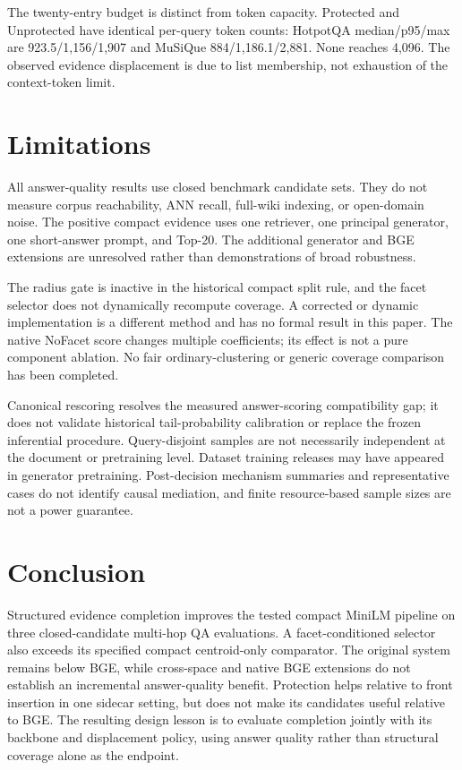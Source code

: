 \documentclass[11pt]{article}
\begin{document}
The twenty-entry budget is distinct from token capacity. Protected and
Unprotected have identical per-query token counts: HotpotQA median/p95/max
are 923.5/1,156/1,907 and MuSiQue 884/1,186.1/2,881. None reaches 4,096.
The observed evidence displacement is due to list membership, not exhaustion
of the context-token limit.

\section{Limitations}
All answer-quality results use closed benchmark candidate sets. They do not
measure corpus reachability, ANN recall, full-wiki indexing, or open-domain
noise. The positive compact evidence uses one retriever, one principal
generator, one short-answer prompt, and Top-20. The additional generator and
BGE extensions are unresolved rather than demonstrations of broad robustness.

The radius gate is inactive in the historical compact split rule, and the
facet selector does not dynamically recompute coverage. A corrected or
dynamic implementation is a different method and has no formal result in this
paper. The native NoFacet score changes multiple coefficients; its effect is
not a pure component ablation. No fair ordinary-clustering or generic
coverage comparison has been completed.

Canonical rescoring resolves the measured answer-scoring compatibility gap;
it does not validate historical tail-probability calibration or replace the
frozen inferential procedure. Query-disjoint samples are not
necessarily independent at the document or pretraining level. Dataset
training releases may have appeared in generator pretraining. Post-decision
mechanism summaries and representative cases do not identify causal
mediation, and finite resource-based sample sizes are not a power guarantee.

\section{Conclusion}
Structured evidence completion improves the tested compact MiniLM pipeline on
three closed-candidate multi-hop QA evaluations. A facet-conditioned selector
also exceeds its specified compact centroid-only comparator. The original
system remains below BGE, while cross-space and native BGE extensions do not
establish an incremental answer-quality benefit. Protection helps relative to
front insertion in one sidecar setting, but does not make its candidates useful
relative to BGE. The resulting design lesson is to evaluate completion jointly
with its backbone and displacement policy, using answer quality rather than
structural coverage alone as the endpoint.
\end{document}
